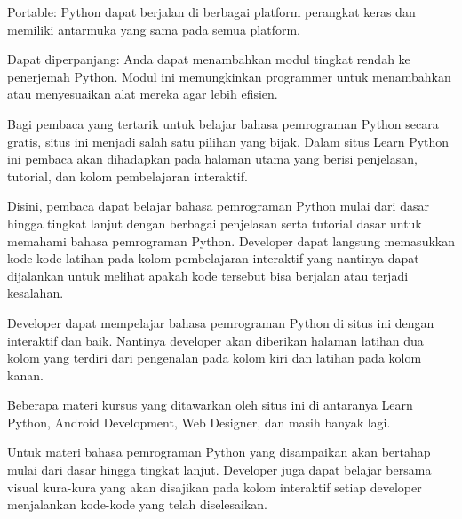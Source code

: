 \vspace{14pt}
\noindent 
{\fontsize{14pt}{14pt}\selectfont Portable: Python dapat berjalan di berbagai platform perangkat keras dan memiliki antarmuka yang sama pada semua platform. \\} \par
\vspace{14pt}
\noindent 
{\fontsize{14pt}{14pt}\selectfont Dapat diperpanjang: Anda dapat menambahkan modul tingkat rendah ke penerjemah Python. Modul ini memungkinkan programmer untuk menambahkan atau menyesuaikan alat mereka agar lebih efisien. \\} \par
\vspace{14pt}
\noindent 
{\fontsize{14pt}{14pt}\selectfont Bagi pembaca yang tertarik untuk belajar bahasa pemrograman Python secara gratis, situs ini menjadi salah satu pilihan yang bijak. Dalam situs Learn Python ini pembaca akan dihadapkan pada halaman utama yang berisi penjelasan, tutorial, dan kolom pembelajaran interaktif. \\} \par
\noindent 
{\fontsize{14pt}{14pt}\selectfont Disini, pembaca dapat belajar bahasa pemrograman Python mulai dari dasar hingga tingkat lanjut dengan berbagai penjelasan serta tutorial dasar untuk memahami bahasa pemrograman Python. Developer dapat langsung memasukkan kode-kode latihan pada kolom pembelajaran interaktif yang nantinya dapat dijalankan untuk melihat apakah kode tersebut bisa berjalan atau terjadi kesalahan. \\} \par
\vspace{14pt}
\noindent 
{\fontsize{14pt}{14pt}\selectfont Developer dapat mempelajar bahasa pemrograman Python di situs ini dengan interaktif dan baik. Nantinya developer akan diberikan halaman latihan dua kolom yang terdiri dari pengenalan pada kolom kiri dan latihan pada kolom kanan. \\} \par
\noindent 
{\fontsize{14pt}{14pt}\selectfont Beberapa materi kursus yang ditawarkan oleh situs ini di antaranya Learn Python, Android Development, Web Designer, dan masih banyak lagi. \\} \par
\vspace{14pt}
\noindent 
{\fontsize{14pt}{14pt}\selectfont Untuk materi bahasa pemrograman Python yang disampaikan akan bertahap mulai dari dasar hingga tingkat lanjut. Developer juga dapat belajar bersama visual kura-kura yang akan disajikan pada kolom interaktif setiap developer menjalankan kode-kode yang telah diselesaikan. \\} \par
